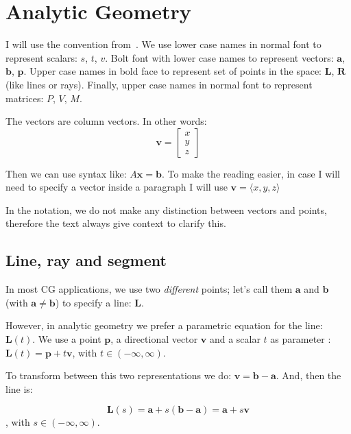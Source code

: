 \section{Analytic Geometry}

I will use the convention from~\cite{Buss2003}.
We use lower case names in normal font to represent scalars: $s$, $t$, $v$.
Bolt font with lower case names to represent vectors: $\mathbf{a}$, $\mathbf{b}$, $\mathbf{p}$.
Upper case names in bold face to represent set of points in the space: $\mathbf{L}$, $\mathbf{R}$ (like lines or rays).
Finally, upper case names in normal font to represent matrices: $P$, $V$, $M$.

The vectors are column vectors. In other words:
$$ \mathbf{v} = \begin{bmatrix}
  x \\ 
  y \\
  z
 \end{bmatrix} $$

Then we can use syntax like: $A \mathbf{x} = \mathbf{b}$.
To make the reading easier, in case I will need to specify a vector inside a paragraph I will use $\mathbf{v} = \langle x, y, z \rangle$

In the notation, we do not make any distinction between vectors and points, therefore the text always give context to clarify this. 

\subsection{Line, ray and segment}

In most CG applications, we use two \emph{different} points; let's call them $\mathbf{a}$ and $\mathbf{b}$ (with $\mathbf{a} \neq \mathbf{b}$) to specify a line: $\mathbf{L}$. 

However, in analytic geometry we prefer a parametric equation for the line: $\mathbf{L}(t)$.
We use a point $\mathbf{p}$, a directional vector $\mathbf{v}$ and a scalar $t$ as parameter : $\mathbf{L}(t) = \mathbf{p} + t \mathbf{v}$, with $t \in (-\infty, \infty)$.

To transform between this two representations we do: $\mathbf{v} = \mathbf{b} -\mathbf{a}$. And, then the line is: 

\begin{equation}
\mathbf{L}(s) = \mathbf{a} + s (\mathbf{b} -\mathbf{a}) = \mathbf{a} + s \mathbf{v} 
\label{eq:line}
\end{equation}
, with $s \in (-\infty, \infty)$. 


